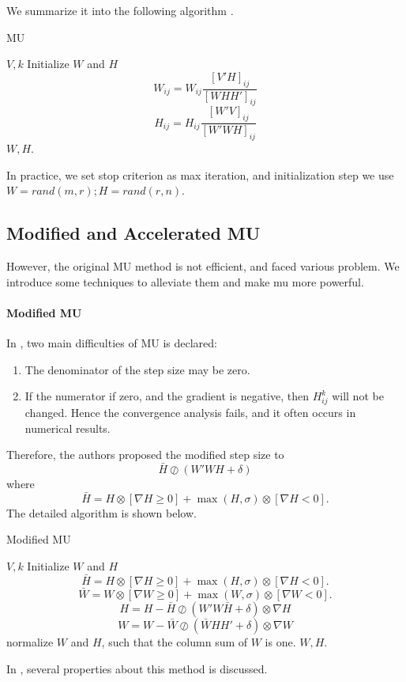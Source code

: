 \documentclass{article}
\renewcommand{\grad}{\nabla}
\begin{document}
We summarize it into the following algorithm \cite{mu}.
\begin{algorithm}[H]
	\caption{MU}
	\begin{algorithmic}[1]
		\REQUIRE $V, k$
		\STATE Initialize $W$ and $H$ 
		\STATE $$W_{ij} = W_{ij}\frac{[V'H]_{ij}}{[WHH']_{ij}}$$
		\STATE $$ H_{ij} = H_{ij}\frac{[W'V]_{ij}}{[W'WH]_{ij}}$$
		\ENDWHILE
		\STATE \Return $W,H$.
	\end{algorithmic}
\end{algorithm}

In practice, we set stop criterion as max iteration, and initialization step we use $W = rand(m,r);H=rand(r,n)$. 
\subsection{Modified and Accelerated MU}
However, the original MU method is not efficient, and faced various problem.  We introduce some techniques to alleviate them and make mu more powerful.
\paragraph{Modified MU}
In \cite{mumod}, two main difficulties of MU is declared:
\begin{enumerate}
	\item The denominator of the step size may be zero.
	\item If the numerator if zero, and the gradient is negative, then $H_{ij}^k$ will not be changed. Hence the convergence analysis fails, and it often occurs in numerical results.
\end{enumerate}
Therefore, the authors proposed the modified step size to 
$$\bar H\oslash(W'WH+\delta)$$
where $$\bar H = H\otimes [\grad H \ge 0 ] + \max(H,\sigma) \otimes  [\grad H < 0 ].$$
The detailed algorithm is shown below.

\begin{algorithm}[H]
	\caption{Modified MU}
	\begin{algorithmic}[1]
		\REQUIRE $V, k$
		\STATE Initialize $W$ and $H$ 
		\STATE $$\bar H = H\otimes [\grad H \ge 0 ] + \max(H,\sigma) \otimes  [\grad H < 0 ].$$
		\STATE$$\bar W = W\otimes [\grad W \ge 0 ] + \max(W,\sigma) \otimes  [\grad W < 0 ].$$
		\STATE $$ H= H - \bar H\oslash(W'W\bar H+\delta)\otimes \grad H$$
		\STATE $$W = W - \bar W \oslash (\bar WHH' + \delta)\otimes \grad W$$
		\STATE normalize $W$ and $H$, such that the column sum of $W$ is one.
		\ENDWHILE
		\STATE \Return $W,H$.
	\end{algorithmic}
\end{algorithm}
In \cite{mumod}, several properties about this method is discussed.
\end{document}
